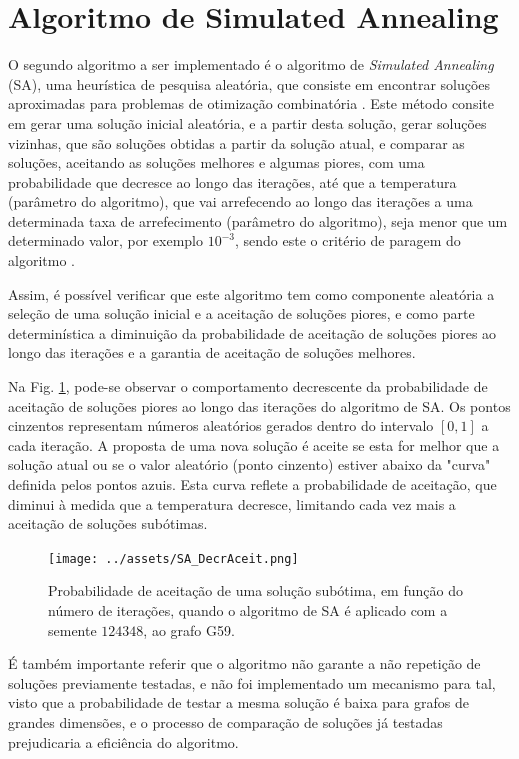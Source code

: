 \documentclass[mirror, portugues]{revdetua}
\begin{document}
\section{Algoritmo de Simulated Annealing}

O segundo algoritmo a ser implementado é o algoritmo de \textit{Simulated Annealing} (SA), uma heurística de pesquisa aleatória, que consiste em encontrar soluções aproximadas para problemas de otimização combinatória \cite{SAT15}. Este método consite em gerar uma solução inicial aleatória, e a partir desta solução, gerar soluções vizinhas, que são soluções obtidas a partir da solução atual, e comparar as soluções, aceitando as soluções melhores e algumas piores, com uma probabilidade que decresce ao longo das iterações, até que a temperatura (parâmetro do algoritmo), que vai arrefecendo ao longo das iterações a uma determinada taxa de arrefecimento (parâmetro do algoritmo), seja menor que um determinado valor, por exemplo $10^{-3}$, sendo este o critério de paragem do algoritmo \cite{SA87}.

Assim, é possível verificar que este algoritmo tem como componente aleatória a seleção de uma solução inicial e a aceitação de soluções piores, e como parte determinística a diminuição da probabilidade de aceitação de soluções piores ao longo das iterações e a garantia de aceitação de soluções melhores.

Na Fig. \ref{fig:sa_aceitacao}, pode-se observar o comportamento decrescente da probabilidade de aceitação de soluções piores ao longo das iterações do algoritmo de SA. Os pontos cinzentos representam números aleatórios gerados dentro do intervalo $[0,1]$ a cada iteração. A proposta de uma nova solução é aceite se esta for melhor que a solução atual ou se o valor aleatório (ponto cinzento) estiver abaixo da "curva" definida pelos pontos azuis. Esta curva reflete a probabilidade de aceitação, que diminui à medida que a temperatura decresce, limitando cada vez mais a aceitação de soluções subótimas.

\begin{figure}[H]
    \centering
    \texttt{[image: ../assets/SA\_DecrAceit.png]}
    \caption{Probabilidade de aceitação de uma solução subótima, em função do número de iterações, quando o algoritmo de SA é aplicado com a semente $124348$, ao grafo G59.}
    \label{fig:sa_aceitacao}
\end{figure}

É também importante referir que o algoritmo não garante a não repetição de soluções previamente testadas, e não foi implementado um mecanismo para tal, visto que a probabilidade de testar a mesma solução é baixa para grafos de grandes dimensões, e o processo de comparação de soluções já testadas prejudicaria a eficiência do algoritmo.
\end{document}
